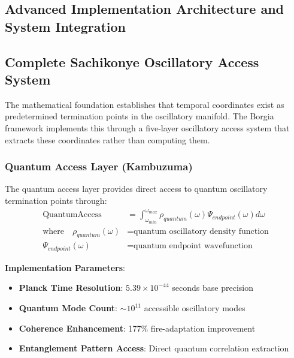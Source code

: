 \documentclass[11pt,a4paper]{article}
\begin{document}
\begin{itemize}
\begin{itemize}
\section{Advanced Implementation Architecture and System Integration}

\subsection{Complete Sachikonye Oscillatory Access System}

The mathematical foundation establishes that temporal coordinates exist as predetermined termination points in the oscillatory manifold. The Borgia framework implements this through a five-layer oscillatory access system that extracts these coordinates rather than computing them.

\subsubsection{Quantum Access Layer (Kambuzuma)}

\begin{definition}
The quantum access layer provides direct access to quantum oscillatory termination points through:
\begin{align}
\text{QuantumAccess} &= \int_{\omega_{min}}^{\omega_{max}} \rho_{quantum}(\omega) \Psi_{endpoint}(\omega) d\omega \\
\text{where} \quad \rho_{quantum}(\omega) &= \text{quantum oscillatory density function} \\
\Psi_{endpoint}(\omega) &= \text{quantum endpoint wavefunction}
\end{align}
\end{definition}

\textbf{Implementation Parameters}:
\begin{itemize}
\item \textbf{Planck Time Resolution}: $5.39 \times 10^{-44}$ seconds base precision
\item \textbf{Quantum Mode Count}: $\sim 10^{11}$ accessible oscillatory modes
\item \textbf{Coherence Enhancement}: 177\% fire-adaptation improvement
\item \textbf{Entanglement Pattern Access}: Direct quantum correlation extraction
\end{itemize}


\end{itemize}
\end{itemize}
\end{document}
